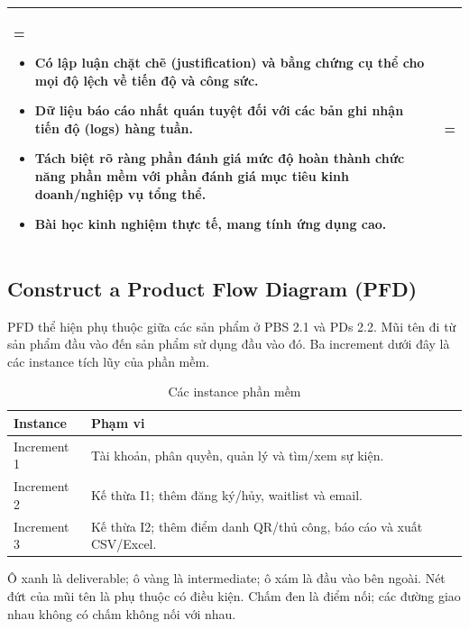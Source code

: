 \documentclass{article}
\begin{document}
\begin{table}[H]
\begin{tabularx}{\textwidth}{|>{\hsize=0.5\hsize\linewidth=\hsize\bfseries}X|>{\hsize=1.5\hsize\linewidth=\hsize}X|}
        \begin{itemize}[leftmargin=*, nosep]
            \item Có lập luận chặt chẽ (justification) và bằng chứng cụ thể cho mọi độ lệch về tiến độ và công sức.
            \item Dữ liệu báo cáo nhất quán tuyệt đối với các bản ghi nhận tiến độ (logs) hàng tuần.
            \item Tách biệt rõ ràng phần đánh giá mức độ hoàn thành chức năng phần mềm với phần đánh giá mục tiêu kinh doanh/nghiệp vụ tổng thể.
            \item Bài học kinh nghiệm thực tế, mang tính ứng dụng cao.
        \end{itemize}
        \vspace{-1em} \\
        \hline
    \end{tabularx}
\end{table}

\clearpage
\subsection{Construct a Product Flow Diagram (PFD)}
PFD thể hiện phụ thuộc giữa các sản phẩm ở PBS 2.1 và PDs 2.2. Mũi tên đi từ sản phẩm đầu vào đến sản phẩm sử dụng đầu vào đó. Ba increment dưới đây là các instance tích lũy của phần mềm.
\begin{table}[H]
\centering
\caption{Các instance phần mềm}
\renewcommand{\arraystretch}{1.3}
\begin{tabularx}{\textwidth}{|p{2.5cm}|X|}
\hline
\textbf{Instance} & \textbf{Phạm vi} \\ \hline
Increment 1 & Tài khoản, phân quyền, quản lý và tìm/xem sự kiện. \\ \hline
Increment 2 & Kế thừa I1; thêm đăng ký/hủy, waitlist và email. \\ \hline
Increment 3 & Kế thừa I2; thêm điểm danh QR/thủ công, báo cáo và xuất CSV/Excel. \\ \hline
\end{tabularx}
\end{table}
Ô xanh là deliverable; ô vàng là intermediate; ô xám là đầu vào bên ngoài. Nét đứt của mũi tên là phụ thuộc có điều kiện. Chấm đen là điểm nối; các đường giao nhau không có chấm không nối với nhau.
\end{document}
